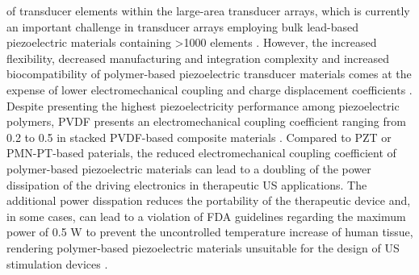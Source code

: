 of transducer elements within the large-area transducer arrays, which is currently an important challenge 
in transducer arrays employing bulk lead-based piezoelectric materials containing >1000 elements 
\cite{https://www.nature.com/articles/s41467-024-47074-1}. 
However, the increased flexibility, decreased manufacturing and integration complexity and increased 
biocompatibility of polymer-based piezoelectric transducer materials comes at the expense of 
lower electromechanical coupling and charge displacement coefficients \cite{https://doi.org/10.1016/j.ceramint.2021.03.054}.
Despite presenting the highest piezoelectricity performance among piezoelectric polymers, PVDF 
presents an electromechanical coupling coefficient ranging from 0.2 to 0.5 in stacked PVDF-based composite materials
\cite{https://doi.org/10.1016/j.jmbbm.2021.104669, https://doi.org/10.1002/adfm.201908724, https://doi.org/10.1007/978-0-387-76540-2_7}. 
Compared to PZT or PMN-PT-based paterials, the reduced electromechanical coupling coefficient of polymer-based 
piezoelectric materials can lead to a doubling of the power dissipation of the driving electronics 
in therapeutic US applications. The additional power disspation reduces the portability 
of the therapeutic device and, in some cases, can lead to a violation of FDA guidelines 
regarding the maximum power of 0.5 W to prevent the uncontrolled temperature increase of human tissue, 
rendering polymer-based piezoelectric materials unsuitable for the design of US stimulation devices \cite{Fomenko2018, Dalecki2004}.



